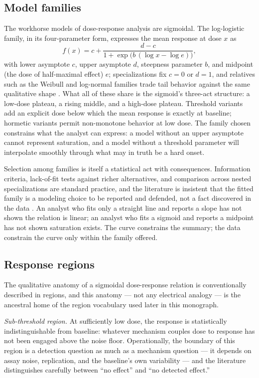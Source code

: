 \subsection{Model families}\label{ch02:dose:families}

The workhorse models of dose-response analysis are sigmoidal. The log-logistic family, in its four-parameter form, expresses the mean response at dose $x$ as
\[
f(x) = c + \frac{d - c}{1 + \exp\bigl(b\,(\log x - \log e)\bigr)},
\]
with lower asymptote $c$, upper asymptote $d$, steepness parameter $b$, and midpoint (the dose of half-maximal effect) $e$; specializations fix $c = 0$ or $d = 1$, and relatives such as the Weibull and log-normal families trade tail behavior against the same qualitative shape \cite{ritz}. What all of these share is the sigmoid's three-act structure: a low-dose plateau, a rising middle, and a high-dose plateau. Threshold variants add an explicit dose below which the mean response is exactly at baseline; hormetic variants permit non-monotone behavior at low dose. The family chosen constrains what the analyst can express: a model without an upper asymptote cannot represent saturation, and a model without a threshold parameter will interpolate smoothly through what may in truth be a hard onset.

Selection among families is itself a statistical act with consequences. Information criteria, lack-of-fit tests against richer alternatives, and comparison across nested specializations are standard practice, and the literature is insistent that the fitted family is a modeling choice to be reported and defended, not a fact discovered in the data \cite{ritz}. An analyst who fits only a straight line and reports a slope has not shown the relation is linear; an analyst who fits a sigmoid and reports a midpoint has not shown saturation exists. The curve constrains the summary; the data constrain the curve only within the family offered.

\subsection{Response regions}\label{ch02:dose:regions}

The qualitative anatomy of a sigmoidal dose-response relation is conventionally described in regions, and this anatomy --- not any electrical analogy --- is the ancestral home of the region vocabulary used later in this monograph.

\emph{Sub-threshold region.} At sufficiently low dose, the response is statistically indistinguishable from baseline: whatever mechanism couples dose to response has not been engaged above the noise floor. Operationally, the boundary of this region is a detection question as much as a mechanism question --- it depends on assay noise, replication, and the baseline's own variability --- and the literature distinguishes carefully between ``no effect'' and ``no detected effect.''

